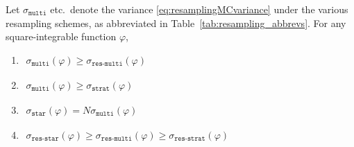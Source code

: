 \begin{prop}\label{thm:resampling_var_compare}
Let $\sigma_{\texttt{multi}}$ etc.\ denote the variance \eqref{eq:resamplingMCvariance} under the various resampling schemes, as abbreviated in Table~\ref{tab:resampling_abbrevs}.
For any square-integrable function $\varphi$,
\begin{enumerate}[label=(\alph*)]
\item \label{item:resampling_var1} \hspace{5pt}
$\begin{aligned}
    \sigma_{\texttt{multi}}(\varphi) 
    \geq \sigma_{\texttt{res-multi}}(\varphi)
\end{aligned}$
\item \label{item:resampling_var2} \hspace{5pt}
$\begin{aligned}
    \sigma_{\texttt{multi}}(\varphi) 
    \geq \sigma_{\texttt{strat}}(\varphi)
\end{aligned}$
\item \label{item:resampling_var3} \hspace{5pt}
$\begin{aligned}
    \sigma_{\texttt{star}}(\varphi) 
    = N \sigma_{\texttt{multi}}(\varphi)
\end{aligned}$
\item \label{item:resampling_var4} \hspace{5pt}
$\begin{aligned}
    \sigma_{\texttt{res-star}}(\varphi) 
    \geq \sigma_{\texttt{res-multi}}(\varphi) 
    \geq \sigma_{\texttt{res-strat}}(\varphi)
\end{aligned}$
\end{enumerate}
\end{prop}

